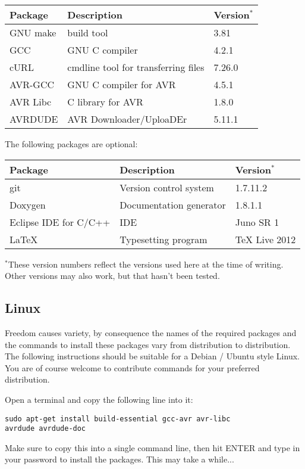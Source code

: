 \begin{tabular}[c]{l l l}
\toprule
Package		& Description	& Version$^*$ \\
\midrule
GNU make 	& build tool			& 3.81 \\
GCC		& GNU C compiler		& 4.2.1 \\
cURL		& cmdline tool for transferring files & 7.26.0 \\
AVR-GCC 	& GNU C compiler for AVR	& 4.5.1 \\
AVR Libc	& C library for AVR		& 1.8.0 \\
AVRDUDE		& AVR Downloader/UploaDEr	& 5.11.1 \\
\bottomrule
\end{tabular}

\clearpage
The following packages are optional:

\begin{tabular}[c]{l l l}
\toprule
Package				& Description			& Version$^*$ \\
\midrule
git				& Version control system 	& 1.7.11.2 \\
Doxygen				& Documentation generator 	& 1.8.1.1 \\
Eclipse IDE for C/C++ 		& IDE				& Juno SR 1 \\
\LaTeX{}			& Typesetting program 		& TeX Live 2012 \\
\bottomrule
\end{tabular}

$^*$These version numbers reflect the versions used here at the time of writing.
Other versions may also work, but that hasn't been tested.

\subsection{Linux}
Freedom causes variety, by consequence the names of the required packages 
and the commands to install these packages vary from distribution 
to distribution.
The following instructions should be suitable for a Debian / Ubuntu style
Linux. You are of course welcome to contribute commands for your preferred distribution. 

Open a terminal and copy the following line into it:

\begin{verbatim}
sudo apt-get install build-essential gcc-avr avr-libc 
avrdude avrdude-doc 
\end{verbatim}

Make sure to copy this into a single command line, then hit ENTER 
and type in your password to install the packages. 
This may take a while...  

